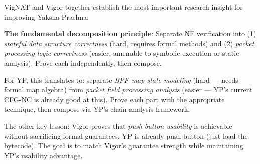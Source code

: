 VigNAT and Vigor together establish the most important research insight for improving Yaksha-Prashna:

\begin{insightbox}
\textbf{The fundamental decomposition principle}: Separate NF verification into (1) \emph{stateful data structure correctness} (hard, requires formal methods) and (2) \emph{packet processing logic correctness} (easier, amenable to symbolic execution or static analysis). Prove each independently, then compose.

For YP, this translates to: separate \emph{BPF map state modeling} (hard --- needs formal map algebra) from \emph{packet field processing analysis} (easier --- YP's current CFG-NC is already good at this). Prove each part with the appropriate technique, then compose via YP's chain analysis framework.
\end{insightbox}

The other key lesson: Vigor proves that \emph{push-button usability} is achievable without sacrificing formal guarantees. YP is already push-button (just load the bytecode). The goal is to match Vigor's guarantee strength while maintaining YP's usability advantage.

